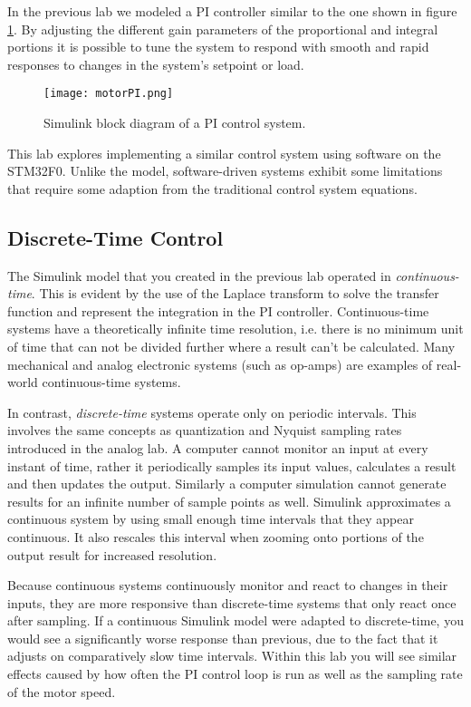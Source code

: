 \documentclass[openany,11pt,fleqn]{book} %
\begin{document}
In the previous lab we modeled a PI controller similar to the one shown in figure \ref{motorPI}. By adjusting the different gain parameters of the proportional and integral portions it is possible to tune the system to respond with smooth and rapid responses to changes in the system's setpoint or load. 

\begin{figure}[tb]
    \centering\texttt{[image: motorPI.png]}
    \caption{Simulink block diagram of a PI control system.}
    \label{motorPI}
\end{figure}

This lab explores implementing a similar control system using software on the STM32F0. Unlike the model, software-driven systems exhibit some limitations that require some adaption from the traditional control system equations. 

\subsection{\color{orange}Discrete-Time Control}

The Simulink model that you created in the previous lab operated in \textit{continuous-time}. This is evident by the use of the Laplace transform to solve the transfer function and represent the integration in the PI controller. Continuous-time systems have a theoretically infinite time resolution, i.e. there is no minimum unit of time that can not be divided further where a result can't be calculated. Many mechanical and analog electronic systems (such as op-amps) are examples of real-world continuous-time systems. 

In contrast, \textit{discrete-time} systems operate only on periodic intervals. This involves the same concepts as quantization and Nyquist sampling rates introduced in the analog lab. A computer cannot monitor an input at every instant of time, rather it periodically samples its input values, calculates a result and then updates the output. Similarly a computer simulation cannot generate results for an infinite number of sample points as well. Simulink approximates a continuous system by using small enough time intervals that they appear continuous. It also rescales this interval when zooming onto portions of the output result for increased resolution. 

Because continuous systems continuously monitor and react to changes in their inputs, they are more responsive than discrete-time systems that only react once after sampling. If a continuous Simulink model were adapted to discrete-time, you would see a significantly worse response than previous, due to the fact that it adjusts on comparatively slow time intervals. Within this lab you will see similar effects caused by how often the PI control loop is run as well as the sampling rate of the motor speed.  
\end{document}
